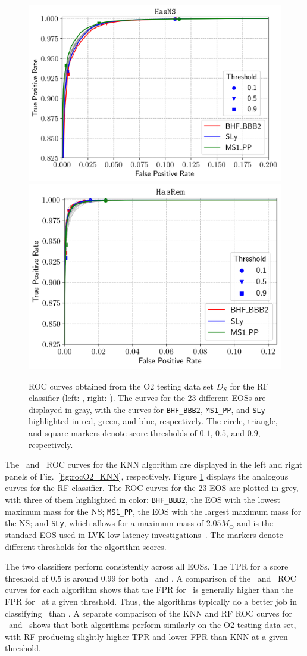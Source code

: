 \begin{figure}%
\includegraphics[width=0.45\linewidth]{roc_testing_RF_NS}
\includegraphics[width=0.45\linewidth]{roc_testing_RF_REM}
\caption{\ac{ROC} curves obtained from the \ac{O2} testing data set $D_S$ for the \ac{RF} classifier (left: \hasns, right: \hasrem). The curves for the 23 different \ac{EOS}s are displayed in
gray, with the curves for {\tt BHF\_BBB2}, {\tt MS1\_PP}, and {\tt SLy} highlighted in red, green, and blue, respectively. The circle, triangle, and square markers denote score thresholds of
$0.1$, $0.5$, and $0.9$, respectively.}
\label{fig:rocO2_RF}
\end{figure}

The \hasns\ and \hasrem\ \ac{ROC} curves for the  \ac{KNN} algorithm are displayed in the left and right panels of Fig.~\ref{fig:rocO2_KNN}, respectively. Figure \ref{fig:rocO2_RF} displays the analogous curves for the \ac{RF} classifier. The \ac{ROC} curves for the 23 \ac{EOS} are plotted in grey, with three of them highlighted in color: {\tt BHF\_BBB2}, the \ac{EOS}
with the lowest maximum mass for the NS; {\tt MS1\_PP}, the \ac{EOS} with the largest maximum mass for the \ac{NS}; and {\tt SLy}, which allows for a maximum mass of $2.05 M_\odot$ and is
the standard \ac{EOS} used in \ac{LVK} low-latency investigations~\cite{Ghosh:2021eqv}. The markers denote different thresholds for the algorithm scores. 

The two classifiers perform consistently across all \ac{EOS}s. The \ac{TPR} for a score threshold of $0.5$ is around $0.99$ for both \hasns\ and \hasrem. A comparison of the
\hasns\ and \hasrem\ \ac{ROC} curves for each algorithm shows that the \ac{FPR} for \hasns\ is generally higher than the \ac{FPR} for \hasrem\ at a given threshold. Thus, the algorithms
typically do a better job in classifying \hasrem\ than \hasns. A separate comparison of the \ac{KNN} and \ac{RF} \ac{ROC} curves for \hasns\ and \hasrem\ shows that both algorithms perform
similarly on the O2 testing data set, with \ac{RF} producing slightly higher \ac{TPR} and lower \ac{FPR} than \ac{KNN} at a given threshold. 

